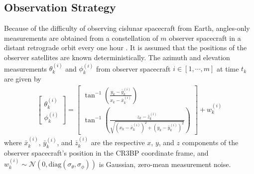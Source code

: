 \documentclass[letterpaper, preprint, paper,11pt]{AAS}	%
\begin{document}
\subsection{Observation Strategy}

Because of the difficulty of observing cislunar spacecraft from Earth, angles-only measurements are obtained from a constellation of $m$ observer spacecraft in a distant retrograde orbit every one hour \cite{gupta2023constellation}. It is assumed that the positions of the observer satellites are known deterministically. The azimuth and elevation measurements $\theta_k^{(i)}$ and $\phi_k^{(i)}$ from observer spacecraft $i \in [1, \cdots, m]$ at time $t_k$ are given by
\begin{align}
    \begin{bmatrix}
        \theta_k^{(i)} \\
        \phi_k^{(i)}
    \end{bmatrix} = \begin{bmatrix}
        \tan^{-1}\left(\frac{y_k - \bar{y}_k^{(i)}}{x_k - \bar{x}_k^{(i)}}\right) \\
        \tan^{-1}\left(\frac{z_k - \bar{z}_k^{(i)}}{\sqrt{(x_k - \bar{x}_k^{(i)})^2 + (y_k - \bar{y}_k^{(i)})^2}}\right)
    \end{bmatrix} + w_k^{(i)}
\end{align}
\noindent where $\bar{x}_k^{(i)}$, $\bar{y}_k^{(i)}$, and $\bar{z}_k^{(i)}$ are the respective $x$, $y$, and $z$ components of the observer spacecraft's position in the CR3BP coordinate frame, and $w_k^{(i)} \sim \mathcal{N}(0, \text{diag}(\sigma_\theta, \sigma_\phi))$ is Gaussian, zero-mean measurement noise. 
\end{document}
